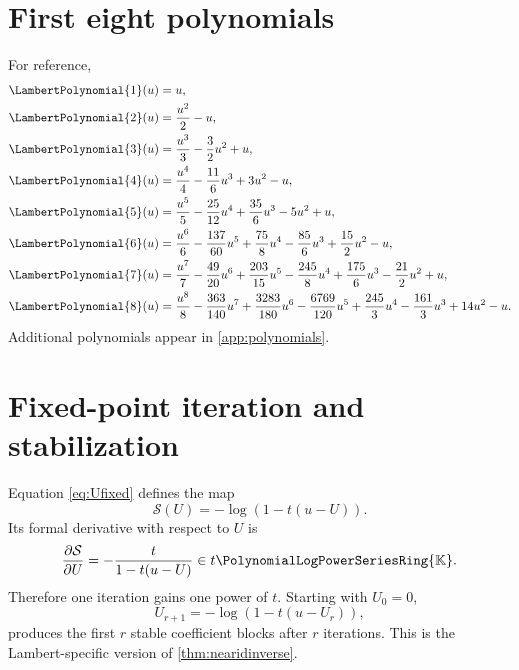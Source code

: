 \documentclass[11pt,oneside,openany]{book}
\newcommand{\K}{\mathbb{K}}
\newcommand{\Rring}{\PolynomialLogPowerSeriesRing{\K}}
\begin{document}
\section{First eight polynomials}
For reference,
\begin{align}
 \LambertPolynomial{1}(u)={}&u,\notag\\
 \LambertPolynomial{2}(u)={}&\frac{u^2}{2}-u,\notag\\
 \LambertPolynomial{3}(u)={}&\frac{u^3}{3}-\frac32u^2+u,\notag\\
 \LambertPolynomial{4}(u)={}&\frac{u^4}{4}-\frac{11}{6}u^3+3u^2-u,\notag\\
 \LambertPolynomial{5}(u)={}&\frac{u^5}{5}-\frac{25}{12}u^4
             +\frac{35}{6}u^3-5u^2+u,\notag\\
 \LambertPolynomial{6}(u)={}&\frac{u^6}{6}-\frac{137}{60}u^5
             +\frac{75}{8}u^4-\frac{85}{6}u^3
             +\frac{15}{2}u^2-u,\notag\\
 \LambertPolynomial{7}(u)={}&\frac{u^7}{7}-\frac{49}{20}u^6
             +\frac{203}{15}u^5-\frac{245}{8}u^4
             +\frac{175}{6}u^3-\frac{21}{2}u^2+u,\notag\\
 \LambertPolynomial{8}(u)={}&\frac{u^8}{8}-\frac{363}{140}u^7
             +\frac{3283}{180}u^6-\frac{6769}{120}u^5
             +\frac{245}{3}u^4-\frac{161}{3}u^3
             +14u^2-u.
 \label{eq:P1to8}
\end{align}
Additional polynomials appear in \cref{app:polynomials}.

\section{Fixed-point iteration and stabilization}
Equation \cref{eq:Ufixed} defines the map
\[
 \mathcal{S}(U)=-\log(1-t(u-U)).
\]
Its formal derivative with respect to \(U\) is
\begin{equation}\label{eq:Sderivative}
 \frac{\partial\mathcal{S}}{\partial U}
 =-\frac{t}{1-t(u-U)}\in t\Rring.
\end{equation}
Therefore one iteration gains one power of \(t\).  Starting with \(U_0=0\),
\begin{equation}\label{eq:Uiteration}
 U_{r+1}=-\log(1-t(u-U_r)),
\end{equation}
produces the first \(r\) stable coefficient blocks after \(r\) iterations.
This is the Lambert-specific version of \cref{thm:nearidinverse}.
\end{document}
